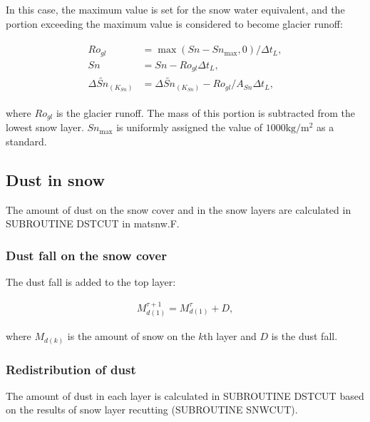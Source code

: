 In this case, the maximum value is set for the snow water equivalent, and the portion exceeding the maximum value is considered to become glacier runoff:

\begin{eqnarray}
\begin{aligned}
 Ro_{gl} &= \max(Sn - Sn_{\mathrm{max}}, 0) / \Delta t_L, \\
 Sn &= Sn - Ro_{gl} \Delta t_L, \\
 \Delta \widetilde{Sn}_{(K_{Sn})} &= \Delta \widetilde{Sn}_{(K_{Sn})} - Ro_{gl} / A_{Sn} \Delta t_L,
\end{aligned} \label{8-46}
\end{eqnarray}

where \(Ro_{gl}\) is the glacier runoff. The mass of this portion is subtracted from the lowest snow layer. \(Sn_{\max}\) is uniformly assigned the value of \(1000 \mathrm{kg/m^2}\) as a standard.

\hypertarget{dust-in-snow}{%
\subsection{Dust in snow}\label{dust-in-snow}}

The amount of dust on the snow cover and in the snow layers are calculated in SUBROUTINE DSTCUT in matsnw.F.

\hypertarget{dust-fall-on-the-snow-cover}{%
\subsubsection{Dust fall on the snow cover}\label{dust-fall-on-the-snow-cover}}

The dust fall is added to the top layer:

\begin{eqnarray}
M_{d(1)}^{\tau+1} = M_{d(1)}^{\tau} + D, \label{8-47}
\end{eqnarray}

where \(M_{d(k)}\) is the amount of snow on the \(k\)th layer and \(D\) is the dust fall.

\hypertarget{redistribution-of-dust}{%
\subsubsection{Redistribution of dust}\label{redistribution-of-dust}}

The amount of dust in each layer is calculated in SUBROUTINE DSTCUT based on the results of snow layer recutting (SUBROUTINE SNWCUT).

